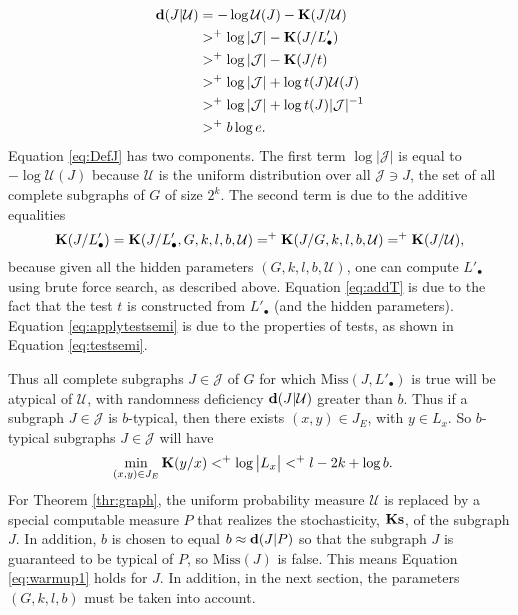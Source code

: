 \documentclass[11pt]{article}\textwidth 6.5in\textheight 9in
\begin{document}
\begin{align}
\nonumber
{\mathbf d}(J|\mathcal{U})&=-\log \mathcal{U}(J)-{\mathbf K}(J/\mathcal{U})\\
\label{eq:DefJ}
&>^+ \log |\mathcal{J}| - {\mathbf K}(J/L'_\bullet)\\
\label{eq:addT}
&>^+ \log |\mathcal{J}| - {\mathbf K}(J/t)\\
\label{eq:applytestsemi}
&>^+ \log |\mathcal{J}| + \log t(J)\mathcal{U}(J)\\
\nonumber 
&>^+ \log |\mathcal{J}| + \log t(J)|\mathcal{J}|^{-1}\\
\nonumber
&>^+ b\log e.
\end{align}
Equation \ref{eq:DefJ} has two components. The first term $\log |\mathcal{J}|$ is equal to $-\log\mathcal{U}(J)$ because $\mathcal{U}$ is the uniform distribution over all $\mathcal{J}\ni J$, the set of all complete subgraphs of $G$ of size $2^k$.  The second term is due to the additive equalities $${\mathbf K}(J/L'_\bullet)={\mathbf K}(J/L'_\bullet,G,k,l,b,\mathcal{U})=^+ {\mathbf K}(J/G,k,l,b,\mathcal{U})=^+{\mathbf K}(J/\mathcal{U}),$$ 
because given all the hidden parameters $(G,k,l,b,\mathcal{U})$, one can compute $L'_\bullet$ using brute force search, as described above. Equation \ref{eq:addT} is due to the fact that the test $t$ is constructed from $L'_\bullet$ (and the hidden parameters). Equation \ref{eq:applytestsemi} is due to the properties of tests, as shown in Equation \ref{eq:testsemi}.

Thus all complete subgraphs $J\in\mathcal{J}$ of $G$ for which $\mathrm{Miss}(J,L'_\bullet)$ is true will be atypical of $\mathcal{U}$, with randomness deficiency ${\mathbf d}(J|\mathcal{U})$ greater than $b$. Thus if a subgraph $J\in\mathcal{J}$ is $b$-typical, then there exists $(x,y)\in J_E$, with $y\in L_x$. So $b$-typical subgraphs $J\in\mathcal{J}$ will have
\begin{align}
\label{eq:warmup1}
\min_{(x,y)\in J_E}{\mathbf K}(y/x)&<^+\log \big|L_x\big|<^+  l-2k+\log b.
\end{align} 
For Theorem \ref{thr:graph}, the uniform probability measure $\mathcal{U}$ is replaced by a special computable measure $P$ that realizes the stochasticity, $\mathbf{Ks}$, of the subgraph $J$. In addition, $b$ is chosen to equal $b\approx {\mathbf d}(J|P)$ so that the subgraph $J$ is guaranteed to be  typical of $P$, so $\mathrm{Miss}(J)$ is false. This means Equation \ref{eq:warmup1} holds for $J$. In addition, in the next section, the parameters $(G,k,l,b)$ must be taken into account. 
\end{document}
